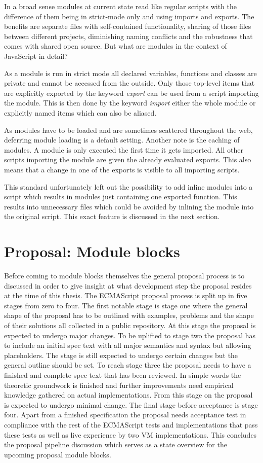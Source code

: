 In a broad sense modules at current state read like regular scripts with the difference of them being in strict-mode only and using imports and exports. The benefits are separate files with self-contained functionality, sharing of those files between different projects, diminishing naming conflicts and the robustness that comes with shared open source. But what are modules in the context of JavaScript in detail?

As a module is run in strict mode all declared variables, functions and classes are private and cannot be accessed from the outside. Only those top-level items that are explicitly exported by the keyword \emph{export} can be used from a script importing the module. This is then done by the keyword \emph{import} either the whole module or explicitly named items which can also be aliased.

As modules have to be loaded and are sometimes scattered throughout the web, deferring module loading is a default setting. Another note is the caching of modules. A module is only executed the first time it gets imported. All other scripts importing the module are given the already evaluated exports. This also means that a change in one of the exports is visible to all importing scripts.

This standard unfortunately left out the possibility to add inline modules into a script which results in modules just containing one exported function. This results into unnecessary files which could be avoided by inlining the module into the original script. This exact feature is discussed in the next section.

\section{Proposal: Module blocks}
Before coming to module blocks themselves the general proposal process is to discussed in order to give insight at what development step the proposal resides at the time of this thesis. The ECMAScript proposal process is split up in five stages from zero to four. The first notable stage is stage one where the general shape of the proposal has to be outlined with examples, problems and the shape of their solutions all collected in a public repository. At this stage the proposal is expected to undergo major changes. To be uplifted to stage two the proposal has to include an initial spec text with all major semantics and syntax but allowing placeholders. The stage is still expected to undergo certain changes but the general outline should be set. To reach stage three the proposal needs to have a finished and complete spec text that has been reviewed. In simple words the theoretic groundwork is finished and further improvements need empirical knowledge gathered on actual implementations. From this stage on the proposal is expected to undergo minimal change. The final stage before acceptance is stage four. Apart from a finished specification the proposal needs acceptance test in compliance with the rest of the ECMAScript tests and implementations that pass these tests as well as live experience by two VM implementations. \cite{ecmaProp} This concludes the proposal pipeline discussion which serves as a state overview for the upcoming proposal module blocks.

